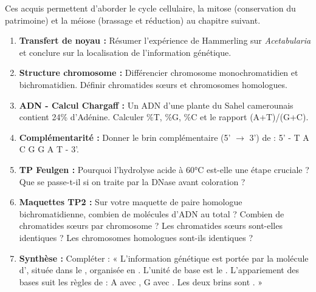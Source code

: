 \documentclass[11pt]{article}
\begin{document}
\noindent Ces acquis permettent d'aborder le cycle cellulaire, la mitose (conservation du patrimoine) et la méiose (brassage et réduction) au chapitre suivant.

\begin{exercice}
\begin{enumerate}
    \item \textbf{Transfert de noyau :} Résumer l'expérience de Hammerling sur \emph{Acetabularia} et conclure sur la localisation de l'information génétique.
    \item \textbf{Structure chromosome :} Différencier chromosome monochromatidien et bichromatidien. Définir chromatides sœurs et chromosomes homologues.
    \item \textbf{ADN - Calcul Chargaff :} Un ADN d'une plante du Sahel camerounais contient 24\% d'Adénine. Calculer \%T, \%G, \%C et le rapport (A+T)/(G+C).
    \item \textbf{Complémentarité :} Donner le brin complémentaire (5' $\rightarrow$ 3') de : 5' - T A C G G A T - 3'.
    \item \textbf{TP Feulgen :} Pourquoi l'hydrolyse acide à 60°C est-elle une étape cruciale ? Que se passe-t-il si on traite par la DNase avant coloration ?
    \item \textbf{Maquettes TP2 :} Sur votre maquette de paire homologue bichromatidienne, combien de molécules d'ADN au total ? Combien de chromatides sœurs par chromosome ? Les chromatides sœurs sont-elles identiques ? Les chromosomes homologues sont-ils identiques ?
    \item \textbf{Synthèse :} Compléter : « L'information génétique est portée par la molécule d'\underline{\hspace{2cm}}, située dans le \underline{\hspace{2cm}}, organisée en \underline{\hspace{2cm}}. L'unité de base est le \underline{\hspace{2cm}}. L'appariement des bases suit les règles de \underline{\hspace{2cm}} : A avec \underline{\hspace{1cm}}, G avec \underline{\hspace{1cm}}. Les deux brins sont \underline{\hspace{2cm}}. »
\end{enumerate}
\end{exercice}
\end{document}
